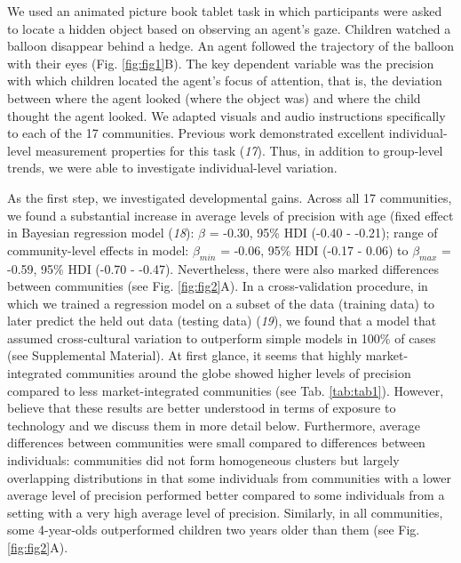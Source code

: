 \documentclass[
  man,floatsintext]{apa6}
\begin{document}
We used an animated picture book tablet task in which participants were asked to locate a hidden object based on observing an agent's gaze. Children watched a balloon disappear behind a hedge. An agent followed the trajectory of the balloon with their eyes (Fig. \ref{fig:fig1}B). The key dependent variable was the precision with which children located the agent's focus of attention, that is, the deviation between where the agent looked (where the object was) and where the child thought the agent looked. We adapted visuals and audio instructions specifically to each of the 17 communities. Previous work demonstrated excellent individual-level measurement properties for this task (\emph{17}). Thus, in addition to group-level trends, we were able to investigate individual-level variation.

As the first step, we investigated developmental gains. Across all 17 communities, we found a substantial increase in average levels of precision with age (fixed effect in Bayesian regression model (\emph{18}): \(\beta\) = -0.30, 95\% HDI (-0.40 - -0.21); range of community-level effects in model: \(\beta_{min}\) = -0.06, 95\% HDI (-0.17 - 0.06) to \(\beta_{max}\) = -0.59, 95\% HDI (-0.70 - -0.47). Nevertheless, there were also marked differences between communities (see Fig. \ref{fig:fig2}A). In a cross-validation procedure, in which we trained a regression model on a subset of the data (training data) to later predict the held out data (testing data) (\emph{19}), we found that a model that assumed cross-cultural variation to outperform simple models in 100\% of cases (see Supplemental Material). At first glance, it seems that highly market-integrated communities around the globe showed higher levels of precision compared to less market-integrated communities (see Tab. \ref{tab:tab1}). However, believe that these results are better understood in terms of exposure to technology and we discuss them in more detail below. Furthermore, average differences between communities were small compared to differences between individuals: communities did not form homogeneous clusters but largely overlapping distributions in that some individuals from communities with a lower average level of precision performed better compared to some individuals from a setting with a very high average level of precision. Similarly, in all communities, some 4-year-olds outperformed children two years older than them (see Fig. \ref{fig:fig2}A).
\end{document}
